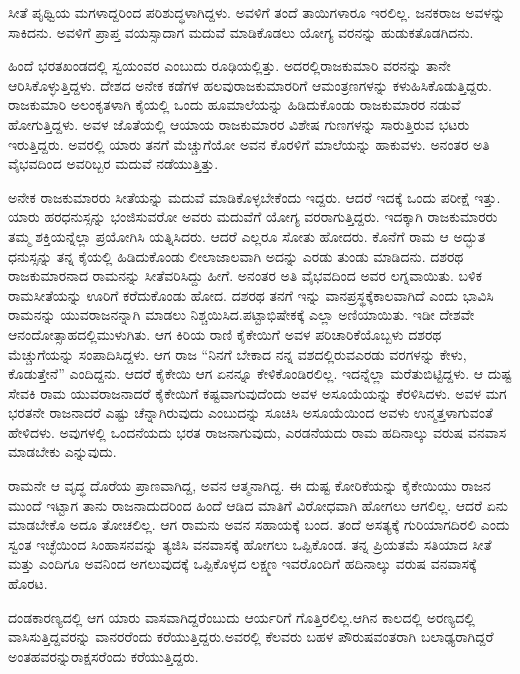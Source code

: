 ಸೀತೆ ಪೃಥ್ವಿಯ ಮಗಳಾದ್ದರಿಂದ ಪರಿಶುದ್ಧಳಾಗಿದ್ದಳು. ಅವಳಿಗೆ ತಂದೆ ತಾಯಿಗಳಾರೂ ಇರಲಿಲ್ಲ. ಜನಕರಾಜ ಅವಳನ್ನು ಸಾಕಿದನು. ಅವಳಿಗೆ ಪ್ರಾಪ್ತ ವಯಸ್ಸಾದಾಗ ಮದುವೆ ಮಾಡಿಕೊಡಲು ಯೋಗ್ಯ ವರನನ್ನು ಹುಡುಕತೊಡಗಿದನು.

ಹಿಂದೆ ಭರತಖಂಡದಲ್ಲಿ ಸ್ವಯಂವರ ಎಂಬುದು ರೂಢಿಯಲ್ಲಿತ್ತು. ಅದರಲ್ಲಿ\break ರಾಜಕುಮಾರಿ ವರನನ್ನು ತಾನೇ ಆರಿಸಿಕೊಳ್ಳುತ್ತಿದ್ದಳು. ದೇಶದ ಅನೇಕ ಕಡೆಗಳ ಹಲವು\break ರಾಜಕುಮಾರರಿಗೆ ಆಮಂತ್ರಣಗಳನ್ನು ಕಳುಹಿಸಿಕೊಡುತ್ತಿದ್ದರು. ರಾಜಕುಮಾರಿ ಅಲಂಕೃತಳಾಗಿ ಕೈಯಲ್ಲಿ ಒಂದು ಹೂಮಾಲೆಯನ್ನು ಹಿಡಿದುಕೊಂಡು ರಾಜಕುಮಾರರ ನಡುವೆ ಹೋಗುತ್ತಿದ್ದಳು. ಅವಳ ಜೊತೆಯಲ್ಲಿ ಆಯಾಯ ರಾಜಕುಮಾರರ ವಿಶೇಷ ಗುಣಗಳನ್ನು ಸಾರುತ್ತಿರುವ ಭಟರು ಇರುತ್ತಿದ್ದರು. ಅವರಲ್ಲಿ ಯಾರು ತನಗೆ ಮೆಚ್ಚುಗೆಯೋ ಅವನ ಕೊರಳಿಗೆ ಮಾಲೆಯನ್ನು ಹಾಕುವಳು. ಅನಂತರ ಅತಿ ವೈಭವದಿಂದ ಅವರಿಬ್ಬರ ಮದುವೆ ನಡೆಯುತ್ತಿತ್ತು.

ಅನೇಕ ರಾಜಕುಮಾರರು ಸೀತೆಯನ್ನು ಮದುವೆ ಮಾಡಿಕೊಳ್ಳಬೇಕೆಂದು ಇದ್ದರು. ಆದರೆ ಇದಕ್ಕೆ ಒಂದು ಪರೀಕ್ಷೆ ಇತ್ತು. ಯಾರು ಹರಧನುಸ್ಸನ್ನು ಭಂಜಿಸುವರೋ ಅವರು ಮದುವೆಗೆ ಯೋಗ್ಯ ವರರಾಗುತ್ತಿದ್ದರು. ಇದಕ್ಕಾಗಿ ರಾಜಕುಮಾರರು ತಮ್ಮ ಶಕ್ತಿಯನ್ನೆಲ್ಲಾ ಪ್ರಯೋಗಿಸಿ ಯತ್ನಿಸಿದರು. ಆದರೆ ಎಲ್ಲರೂ ಸೋತು ಹೋದರು. ಕೊನೆಗೆ ರಾಮ ಆ ಅದ್ಭುತ ಧನುಸ್ಸನ್ನು ತನ್ನ ಕೈಯಲ್ಲಿ ಹಿಡಿದುಕೊಂಡು ಲೀಲಾಜಾಲವಾಗಿ ಅದನ್ನು ಎರಡು ತುಂಡು ಮಾಡಿದನು. ದಶರಥ ರಾಜಕುಮಾರನಾದ ರಾಮನನ್ನು ಸೀತೆ\break ವರಿಸಿದ್ದು ಹೀಗೆ. ಅನಂತರ ಅತಿ ವೈಭವದಿಂದ ಅವರ ಲಗ್ನವಾಯಿತು. ಬಳಿಕ ರಾಮ\break ಸೀತೆಯನ್ನು ಊರಿಗೆ ಕರೆದುಕೊಂಡು ಹೋದ. ದಶರಥ ತನಗೆ ಇನ್ನು ವಾನಪ್ರಸ್ಥಕ್ಕೆ\break ಕಾಲವಾಗಿದೆ ಎಂದು ಭಾವಿಸಿ ರಾಮನನ್ನು ಯುವರಾಜನನ್ನಾಗಿ ಮಾಡಲು ನಿಶ್ಚಯಿಸಿದ.\break ಪಟ್ಟಾಭಿಷೇಕಕ್ಕೆ ಎಲ್ಲಾ ಅಣಿಯಾಯಿತು. ಇಡೀ ದೇಶವೇ ಆನಂದೋತ್ಸಾಹದಲ್ಲಿ\break ಮುಳುಗಿತು. ಆಗ ಕಿರಿಯ ರಾಣಿ ಕೈಕೇಯಿಗೆ ಅವಳ ಪರಿಚಾರಿಕೆಯೊಬ್ಬಳು ದಶರಥ ಮೆಚ್ಚುಗೆಯನ್ನು ಸಂಪಾದಿಸಿದ್ದಳು. ಆಗ ರಾಜ “ನಿನಗೆ ಬೇಕಾದ ನನ್ನ ವಶದಲ್ಲಿರುವ\break ಎರಡು ವರಗಳನ್ನು ಕೇಳು, ಕೊಡುತ್ತೇನೆ” ಎಂದಿದ್ದನು. ಆದರೆ ಕೈಕೇಯಿ ಆಗ ಏನನ್ನೂ ಕೇಳಿಕೊಂಡಿರಲಿಲ್ಲ. ಇದನ್ನೆಲ್ಲಾ ಮರೆತುಬಿಟ್ಟಿದ್ದಳು. ಆ ದುಷ್ಟ ಸೇವಕಿ ರಾಮ ಯುವರಾಜನಾದರೆ ಕೈಕೇಯಿಗೆ ಕಷ್ಟವಾಗುವುದೆಂದು ಅವಳ ಅಸೂಯೆಯನ್ನು ಕೆರಳಿಸಿದಳು. ಅವಳ ಮಗ ಭರತನೇ ರಾಜನಾದರೆ ಎಷ್ಟು ಚೆನ್ನಾಗಿರುವುದು ಎಂಬುದನ್ನು ಸೂಚಿಸಿ ಅಸೂಯೆಯಿಂದ ಅವಳು ಉನ್ಮತ್ತಳಾಗುವಂತೆ ಹೇಳಿದಳು. ಅವುಗಳಲ್ಲಿ ಒಂದನೆಯದು ಭರತ ರಾಜನಾಗುವುದು, ಎರಡನೆಯದು ರಾಮ ಹದಿನಾಲ್ಕು ವರುಷ ವನವಾಸ ಮಾಡಬೇಕು ಎನ್ನುವುದು.

ರಾಮನೇ ಆ ವೃದ್ಧ ದೊರೆಯ ಪ್ರಾಣವಾಗಿದ್ದ, ಅವನ ಆತ್ಮನಾಗಿದ್ದ. ಈ ದುಷ್ಟ ಕೋರಿಕೆಯನ್ನು ಕೈಕೇಯಿಯು ರಾಜನ ಮುಂದೆ ಇಟ್ಟಾಗ ತಾನು ರಾಜನಾದುದರಿಂದ ಹಿಂದೆ ಆಡಿದ ಮಾತಿಗೆ ವಿರೋಧವಾಗಿ ಹೋಗಲು ಆಗಲಿಲ್ಲ. ಆದರೆ ಏನು ಮಾಡಬೇಕೊ ಅದೂ ತೋಚಲಿಲ್ಲ. ಆಗ ರಾಮನು ಅವನ ಸಹಾಯಕ್ಕೆ ಬಂದ. ತಂದೆ ಅಸತ್ಯಕ್ಕೆ ಗುರಿಯಾಗದಿರಲಿ ಎಂದು ಸ್ವಂತ ಇಚ್ಛೆಯಿಂದ ಸಿಂಹಾಸನವನ್ನು ತ್ಯಜಿಸಿ ವನವಾಸಕ್ಕೆ ಹೋಗಲು ಒಪ್ಪಿಕೊಂಡ. ತನ್ನ ಪ್ರಿಯತಮೆ ಸತಿಯಾದ ಸೀತೆ ಮತ್ತು ಎಂದಿಗೂ ಅವನಿಂದ ಅಗಲುವುದಕ್ಕೆ ಒಪ್ಪಿಕೊಳ್ಳದ ಲಕ್ಷ್ಮಣ ಇವರೊಂದಿಗೆ ಹದಿನಾಲ್ಕು ವರುಷ ವನವಾಸಕ್ಕೆ ಹೊರಟ.

ದಂಡಕಾರಣ್ಯದಲ್ಲಿ ಆಗ ಯಾರು ವಾಸವಾಗಿದ್ದರೆಂಬುದು ಆರ್ಯರಿಗೆ ಗೊತ್ತಿರಲಿಲ್ಲ.\break ಆಗಿನ ಕಾಲದಲ್ಲಿ ಅರಣ್ಯದಲ್ಲಿ ವಾಸಿಸುತ್ತಿದ್ದವರನ್ನು ವಾನರರೆಂದು ಕರೆಯುತ್ತಿದ್ದರು.\break ಅವರಲ್ಲಿ ಕೆಲವರು ಬಹಳ ಪೌರುಷವಂತರಾಗಿ ಬಲಾಢ್ಯರಾಗಿದ್ದರೆ ಅಂತಹವರನ್ನು\break ರಾಕ್ಷಸರೆಂದು ಕರೆಯುತ್ತಿದ್ದರು.

